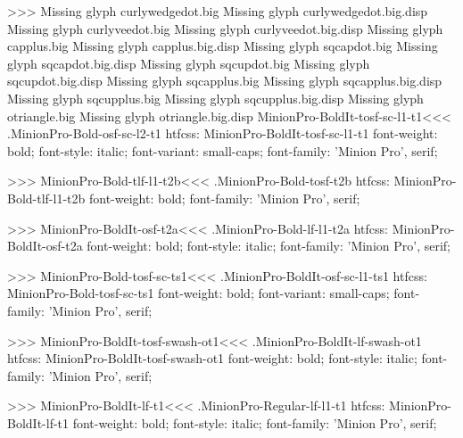 {{{>>>
Missing glyph	curlywedgedot.big
Missing glyph	curlywedgedot.big.disp
Missing glyph	curlyveedot.big
Missing glyph	curlyveedot.big.disp
Missing glyph	capplus.big
Missing glyph	capplus.big.disp
Missing glyph	sqcapdot.big
Missing glyph	sqcapdot.big.disp
Missing glyph	sqcupdot.big
Missing glyph	sqcupdot.big.disp
Missing glyph	sqcapplus.big
Missing glyph	sqcapplus.big.disp
Missing glyph	sqcupplus.big
Missing glyph	sqcupplus.big.disp
Missing glyph	otriangle.big
Missing glyph	otriangle.big.disp
\<MinionPro-BoldIt-tosf-sc-l1-t1\><<<
.MinionPro-Bold-osf-sc-l2-t1
htfcss:  MinionPro-BoldIt-tosf-sc-l1-t1  font-weight: bold; font-style: italic; font-variant: small-caps; font-family: 'Minion Pro', serif;

>>>
\<MinionPro-Bold-tlf-l1-t2b\><<<
.MinionPro-Bold-tosf-t2b
htfcss:  MinionPro-Bold-tlf-l1-t2b  font-weight: bold; font-family: 'Minion Pro', serif;

>>>
\<MinionPro-BoldIt-osf-t2a\><<<
.MinionPro-Bold-lf-l1-t2a
htfcss:  MinionPro-BoldIt-osf-t2a  font-weight: bold; font-style: italic; font-family: 'Minion Pro', serif;

>>>
\<MinionPro-Bold-tosf-sc-ts1\><<<
.MinionPro-BoldIt-osf-sc-l1-ts1
htfcss:  MinionPro-Bold-tosf-sc-ts1  font-weight: bold; font-variant: small-caps; font-family: 'Minion Pro', serif;

>>>
\<MinionPro-BoldIt-tosf-swash-ot1\><<<
.MinionPro-BoldIt-lf-swash-ot1
htfcss:  MinionPro-BoldIt-tosf-swash-ot1  font-weight: bold; font-style: italic; font-family: 'Minion Pro', serif;

>>>
\<MinionPro-BoldIt-lf-t1\><<<
.MinionPro-Regular-lf-l1-t1
htfcss:  MinionPro-BoldIt-lf-t1  font-weight: bold; font-style: italic; font-family: 'Minion Pro', serif;

}}}
